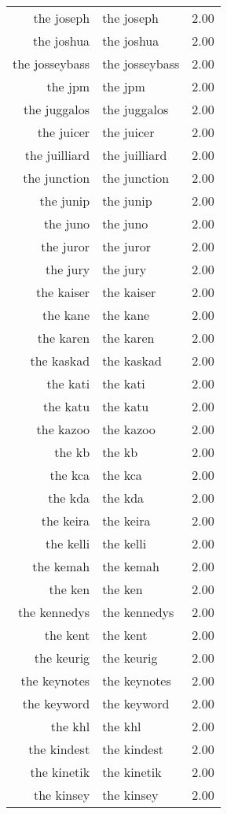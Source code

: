 \begin{table}[ht]
\begin{tabular}{rlr}
  the joseph & the joseph & 2.00 \\ 
  the joshua & the joshua & 2.00 \\ 
  the josseybass & the josseybass & 2.00 \\ 
  the jpm & the jpm & 2.00 \\ 
  the juggalos & the juggalos & 2.00 \\ 
  the juicer & the juicer & 2.00 \\ 
  the juilliard & the juilliard & 2.00 \\ 
  the junction & the junction & 2.00 \\ 
  the junip & the junip & 2.00 \\ 
  the juno & the juno & 2.00 \\ 
  the juror & the juror & 2.00 \\ 
  the jury & the jury & 2.00 \\ 
  the kaiser & the kaiser & 2.00 \\ 
  the kane & the kane & 2.00 \\ 
  the karen & the karen & 2.00 \\ 
  the kaskad & the kaskad & 2.00 \\ 
  the kati & the kati & 2.00 \\ 
  the katu & the katu & 2.00 \\ 
  the kazoo & the kazoo & 2.00 \\ 
  the kb & the kb & 2.00 \\ 
  the kca & the kca & 2.00 \\ 
  the kda & the kda & 2.00 \\ 
  the keira & the keira & 2.00 \\ 
  the kelli & the kelli & 2.00 \\ 
  the kemah & the kemah & 2.00 \\ 
  the ken & the ken & 2.00 \\ 
  the kennedys & the kennedys & 2.00 \\ 
  the kent & the kent & 2.00 \\ 
  the keurig & the keurig & 2.00 \\ 
  the keynotes & the keynotes & 2.00 \\ 
  the keyword & the keyword & 2.00 \\ 
  the khl & the khl & 2.00 \\ 
  the kindest & the kindest & 2.00 \\ 
  the kinetik & the kinetik & 2.00 \\ 
  the kinsey & the kinsey & 2.00 \\ 

\end{tabular}
\end{table}

